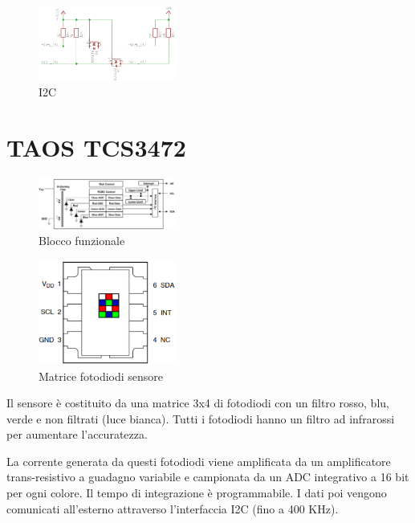 \documentclass[12pt]{report}
\begin{document}
\begin{figure}
\centering
    \includegraphics[width=0.4\textwidth]{Immagini_sensore/I2C_3V3_to_5.png}
    \caption{I2C}
    \label{fig:I2C}
\end{figure}

\section{TAOS TCS3472}

\begin{figure}
\centering
    \includegraphics[width=0.4\textwidth]{Immagini_sensore/Blocco_funzionale.png}
    \caption{Blocco funzionale}
\end{figure}
    
\begin{figure}
\centering
    \includegraphics[width=0.4\textwidth]{Immagini_sensore/sensore.png}
    \caption{Matrice fotodiodi sensore}
\end{figure}

Il sensore è costituito da una matrice 3x4 di fotodiodi con un filtro rosso, blu, verde e non filtrati (luce bianca). Tutti i fotodiodi hanno un filtro ad infrarossi per aumentare l'accuratezza. 

La corrente generata da questi fotodiodi viene amplificata da un amplificatore trans-resistivo a guadagno variabile e campionata da un ADC integrativo a 16 bit per ogni colore. Il tempo di integrazione è programmabile. I dati poi vengono comunicati all'esterno attraverso l'interfaccia I2C (fino a 400 KHz).
\end{document}
